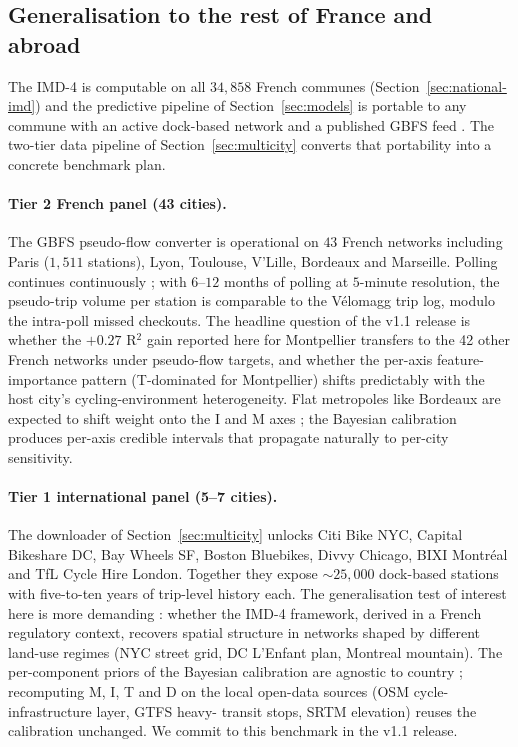 \documentclass[11pt,a4paper]{article}
\begin{document}
\subsection{Generalisation to the rest of France and abroad}
\label{sec:future}

The IMD-4 is computable on all $34{,}858$ French communes
(Section~\ref{sec:national-imd}) and the predictive pipeline of
Section~\ref{sec:models} is portable to any commune with an
active dock-based network and a published GBFS feed
\citep{Fosse2026gold}.  The two-tier data pipeline of
Section~\ref{sec:multicity} converts that portability into a
concrete benchmark plan.

\paragraph{Tier 2 French panel (43 cities).}
The GBFS pseudo-flow converter is operational on $43$ French
networks including Paris ($1{,}511$ stations), Lyon, Toulouse,
V'Lille, Bordeaux and Marseille.  Polling continues
continuously ; with $6$--$12$ months of polling at $5$-minute
resolution, the pseudo-trip volume per station is comparable to
the V\'elomagg trip log, modulo the intra-poll missed checkouts.
The headline question of the v1.1 release is whether the
$+0.27$ R$^2$ gain reported here for Montpellier transfers to
the 42 other French networks under pseudo-flow targets, and
whether the per-axis feature-importance pattern (T-dominated for
Montpellier) shifts predictably with the host city's
cycling-environment heterogeneity.  Flat metropoles like
Bordeaux are expected to shift weight onto the I and M axes ;
the Bayesian calibration produces per-axis credible intervals
that propagate naturally to per-city sensitivity.

\paragraph{Tier 1 international panel (5--7 cities).}
The downloader of Section~\ref{sec:multicity} unlocks
Citi Bike NYC, Capital Bikeshare DC, Bay Wheels SF, Boston
Bluebikes, Divvy Chicago, BIXI Montr\'eal and TfL Cycle Hire
London.  Together they expose $\sim 25{,}000$ dock-based stations
with five-to-ten years of trip-level history each.  The
generalisation test of interest here is more demanding : whether
the IMD-4 framework, derived in a French regulatory context,
recovers spatial structure in networks shaped by different
land-use regimes (NYC street grid, DC L'Enfant plan, Montreal
mountain).  The per-component priors of the Bayesian calibration
are agnostic to country ; recomputing M, I, T and D on the local
open-data sources (OSM cycle-infrastructure layer, GTFS heavy-
transit stops, SRTM elevation) reuses the calibration
unchanged.  We commit to this benchmark in the v1.1 release.
\end{document}
